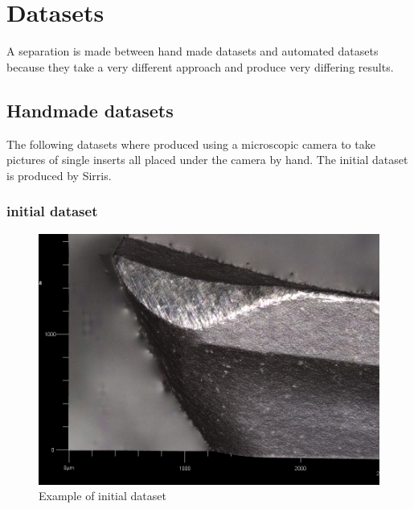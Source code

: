 \section{Datasets}
\label{sec:impl:dataset}
A separation is made between hand made datasets and automated datasets because they take a very different approach and produce very differing results.

	\subsection{Handmade datasets}

The following datasets where produced using a microscopic camera to take pictures of single inserts all placed under the camera by hand. The initial dataset is produced by Sirris.

		\subsubsection{initial dataset}

			
			
			\begin{figure}[hbtp]
			\centering
			\includegraphics[scale=0.2]{fig/Vision/Dataset/handmade_datasets/initial_dataset/initial dataset pictuer.PNG}
			\caption{Example of initial dataset}
			\label{fig:dataset:initial}
			\end{figure}

